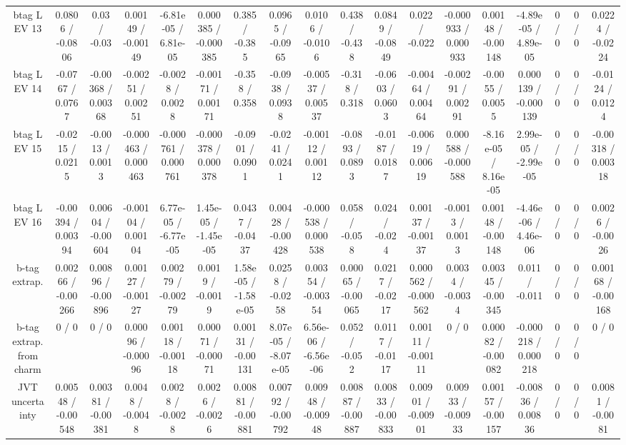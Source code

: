 \documentclass[10pt]{article}
\begin{document}
\begin{table}[htbp]
\begin{center}
\begin{tabular}{|c|c|c|c|c|c|c|c|c|c|c|c|c|c|c|c|c|c|}
  btag L EV 13 & 0.0806 / -0.0806 & 0.03 / -0.03 & 0.00149 / -0.00149 & -6.81e-05 / 6.81e-05 & 0.000385 / -0.000385 & 0.385 / -0.385 & 0.0965 / -0.0965 & 0.0106 / -0.0106 & 0.438 / -0.438 & 0.0849 / -0.0849 & 0.022 / -0.022 & -0.000933 / 0.000933 & 0.00148 / -0.00148 & -4.89e-05 / 4.89e-05 & 0 / 0 & 0 / 0 & 0.0224 / -0.0224 \\ 
  btag L EV 14 & -0.0767 / 0.0767 & -0.00368 / 0.00368 & -0.00251 / 0.00251 & -0.0028 / 0.0028 & -0.00171 / 0.00171 & -0.358 / 0.358 & -0.0938 / 0.0938 & -0.00537 / 0.00537 & -0.318 / 0.318 & -0.0603 / 0.0603 & -0.00464 / 0.00464 & -0.00291 / 0.00291 & -0.0055 / 0.0055 & 0.000139 / -0.000139 & 0 / 0 & 0 / 0 & -0.0124 / 0.0124 \\ 
  btag L EV 15 & -0.0215 / 0.0215 & -0.0013 / 0.0013 & -0.000463 / 0.000463 & -0.000761 / 0.000761 & -0.000378 / 0.000378 & -0.0901 / 0.0901 & -0.0241 / 0.0241 & -0.00112 / 0.00112 & -0.0893 / 0.0893 & -0.0187 / 0.0187 & -0.00619 / 0.00619 & 0.000588 / -0.000588 & -8.16e-05 / 8.16e-05 & 2.99e-05 / -2.99e-05 & 0 / 0 & 0 / 0 & -0.00318 / 0.00318 \\ 
  btag L EV 16 & -0.00394 / 0.00394 & 0.00604 / -0.00604 & -0.00104 / 0.00104 & 6.77e-05 / -6.77e-05 & 1.45e-05 / -1.45e-05 & 0.0437 / -0.0437 & 0.00428 / -0.00428 & -0.000538 / 0.000538 & 0.058 / -0.058 & 0.024 / -0.024 & 0.00137 / -0.00137 & -0.0013 / 0.0013 & 0.00148 / -0.00148 & -4.46e-06 / 4.46e-06 & 0 / 0 & 0 / 0 & 0.0026 / -0.0026 \\ 
  b-tag extrap. & 0.00266 / -0.00266 & 0.00896 / -0.00896 & 0.00127 / -0.00127 & 0.00279 / -0.00279 & 0.0019 / -0.0019 & 1.58e-05 / -1.58e-05 & 0.0258 / -0.0258 & 0.00354 / -0.00354 & 0.00065 / -0.00065 & 0.0217 / -0.0217 & 0.000562 / -0.000562 & 0.0034 / -0.0034 & 0.00345 / -0.00345 & 0.011 / -0.011 & 0 / 0 & 0 / 0 & 0.00168 / -0.00168 \\ 
  b-tag extrap. from charm & 0 / 0 & 0 / 0 & 0.00096 / -0.00096 & 0.00118 / -0.00118 & 0.00071 / -0.00071 & 0.00131 / -0.00131 & 8.07e-05 / -8.07e-05 & 6.56e-06 / -6.56e-06 & 0.052 / -0.052 & 0.0117 / -0.0117 & 0.00111 / -0.00111 & 0 / 0 & 0.00082 / -0.00082 & -0.000218 / 0.000218 & 0 / 0 & 0 / 0 & 0 / 0 \\ 
  JVT uncertainty & 0.00548 / -0.00548 & 0.00381 / -0.00381 & 0.0048 / -0.0048 & 0.0028 / -0.0028 & 0.0026 / -0.0026 & 0.00881 / -0.00881 & 0.00792 / -0.00792 & 0.00948 / -0.00948 & 0.00887 / -0.00887 & 0.00833 / -0.00833 & 0.00901 / -0.00901 & 0.00933 / -0.00933 & 0.00157 / -0.00157 & -0.00836 / 0.00836 & 0 / 0 & 0 / 0 & 0.0081 / -0.0081 \\ 

\end{tabular}
\end{center}
\end{table}
\end{document}
